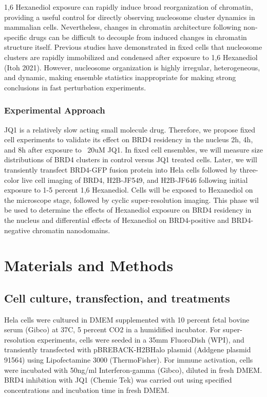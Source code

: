 \documentclass{ucetd}
\begin{document}
1,6 Hexanediol exposure can rapidly induce broad reorganization of chromatin, providing a useful control for directly observing nucleosome cluster dynamics in mammalian cells. Nevertheless, changes in chromatin architecture following non-specific drugs can be difficult to decouple from induced changes in chromatin structure itself. Previous studies have demonstrated in fixed cells that nucleosome clusters are rapidly immobilized and condensed after exposure to 1,6 Hexanediol (Itoh 2021). However, nucleosome organization is highly irregular, heterogeneous, and dynamic, making ensemble statistics inappropriate for making strong conclusions in fast perturbation experiments. 

\subsubsection{Experimental Approach}

JQ1 is a relatively slow acting small molecule drug. Therefore, we propose fixed cell experiments to validate its effect on BRD4 residency in the nucleus 2h, 4h, and 8h after exposure to ~20uM JQ1. In fixed cell ensembles, we will measure size distributions of BRD4 clusters in control versus JQ1 treated cells. Later, we will transiently transfect BRD4-GFP fusion protein into Hela cells followed by three-color live cell imaging of BRD4, H2B-JF549, and H2B-JF646 following initial exposure to 1-5 percent 1,6 Hexanediol. Cells will be exposed to Hexanediol on the microscope stage, followed by cyclic super-resolution imaging. This phase wil be used to determine the effects of Hexanediol exposure on BRD4 residency in the nucleus and differential effects of Hexanediol on BRD4-positive and BRD4-negative chromatin nanodomains. 

\section{Materials and Methods}

\subsection{Cell culture, transfection, and treatments}

Hela cells were cultured in DMEM supplemented with 10 percent fetal bovine serum (Gibco) at 37C, 5  percent  CO2 in a humidified incubator. For super-resolution experiments, cells were seeded in a 35mm FluoroDish (WPI), and transiently transfected with pBREBACK-H2BHalo plasmid (Addgene plasmid 91564) using Lipofectamine 3000 (ThermoFisher). For immune activation, cells were incubated with 50ng/ml Interferon-gamma (Gibco), diluted in fresh DMEM. BRD4 inhibition with JQ1 (Chemie Tek) was carried out using specified concentrations and incubation time in fresh DMEM.  
\end{document}
